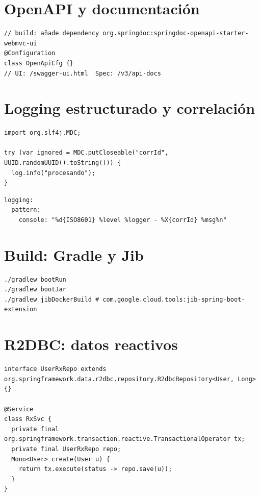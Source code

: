 \documentclass[11pt,a4paper]{article}
\begin{document}
\section{OpenAPI y documentación}
\begin{lstlisting}[style=javastyle, caption={springdoc-openapi configuración mínima}] 
// build: añade dependency org.springdoc:springdoc-openapi-starter-webmvc-ui
@Configuration
class OpenApiCfg {}
// UI: /swagger-ui.html  Spec: /v3/api-docs
\end{lstlisting}

\section{Logging estructurado y correlación}
\begin{lstlisting}[style=javastyle, caption={MDC para correlation id}]
import org.slf4j.MDC;

try (var ignored = MDC.putCloseable("corrId", UUID.randomUUID().toString())) {
  log.info("procesando");
}
\end{lstlisting}

\begin{lstlisting}[style=yamlstyle, caption={Logback JSON (ejemplo)}]
logging:
  pattern:
    console: "%d{ISO8601} %level %logger - %X{corrId} %msg%n"
\end{lstlisting}

\section{Build: Gradle y Jib}
\begin{lstlisting}[style=bashstyle, caption={Gradle y Jib}]
./gradlew bootRun
./gradlew bootJar
./gradlew jibDockerBuild # com.google.cloud.tools:jib-spring-boot-extension
\end{lstlisting}

\section{R2DBC: datos reactivos}
\begin{lstlisting}[style=javastyle, caption={Repositorio reactive y tx}] 
interface UserRxRepo extends org.springframework.data.r2dbc.repository.R2dbcRepository<User, Long> {}

@Service
class RxSvc {
  private final org.springframework.transaction.reactive.TransactionalOperator tx;
  private final UserRxRepo repo;
  Mono<User> create(User u) {
    return tx.execute(status -> repo.save(u));
  }
}
\end{lstlisting}
\end{document}
